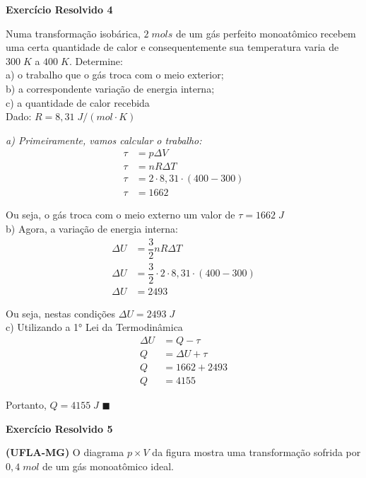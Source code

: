 \documentclass[12pt]{article}
\newenvironment{resposta*}
{\bf Resposta:\\ }
{}
\begin{document}
\textbf{Exercício Resolvido 4}


Numa transformação isobárica, $2\;mols$ de um gás perfeito monoatômico recebem uma certa quantidade de calor e consequentemente sua temperatura varia de $300\;K$ a $400\;K$. Determine: \\
a) o trabalho que o gás troca com o meio exterior; \\
b) a correspondente variação de energia interna; \\
c) a quantidade de calor recebida \\
Dado: $R=8,31\;J/(mol\cdot K)$


\begin{resposta*}
{\it a) Primeiramente, vamos calcular o trabalho:
\begin{align*}
    \tau &= p\Delta V \\
    \tau &= nR\Delta T \\
    \tau &= 2\cdot 8,31\cdot (400-300) \\
    \tau &= 1662
\end{align*}

Ou seja, o gás troca com o meio externo um valor de $\boxed{\tau = 1662\;J}$ \\

b) Agora, a variação de energia interna:
\begin{align*}
    \Delta U &= \dfrac{3}{2}nR\Delta T \\
    \Delta U &= \dfrac{3}{2}\cdot 2\cdot 8,31\cdot (400-300)  \\
    \Delta U &= 2493
\end{align*}

Ou seja, nestas condições $\boxed{\Delta U = 2493\;J}$ \\

c) Utilizando a 1° Lei da Termodinâmica
\begin{align*}
    \Delta U &= Q - \tau \\
    Q &= \Delta U + \tau \\
    Q &= 1662 + 2493 \\
    Q &= 4155
\end{align*}

Portanto, $\boxed{Q = 4155\;J}$ $\blacksquare$}
\end{resposta*}

\textbf{Exercício Resolvido 5}


\textbf{(UFLA-MG)} O diagrama $p \times V$ da figura mostra uma transformação sofrida por $0,4\;mol$ de um gás monoatômico ideal.
\end{document}
